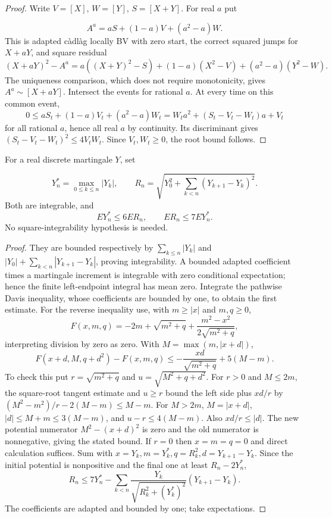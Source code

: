 \begin{proof}
Write $V=[X]$, $W=[Y]$, $S=[X+Y]$. For real $a$ put

\[
 A^a=aS+(1-a)V+(a^2-a)W.
\] This is adapted c\`adl\`ag locally BV with zero
start, the correct squared jumps for $X+aY$, and square residual
\[
 (X+aY)^2-A^a=a((X+Y)^2-S)+(1-a)(X^2-V)+(a^2-a)(Y^2-W).
\]
The uniqueness comparison, which does not require monotonicity, gives
$A^a\sim[X+aY]$. Intersect the events for rational $a$.
At every time on this common event,
\[
 0\leq aS_t+(1-a)V_t+(a^2-a)W_t
 =W_ta^2+(S_t-V_t-W_t)a+V_t
\]
for all rational $a$, hence all real $a$ by continuity. Its discriminant gives
$(S_t-V_t-W_t)^2\leq4V_tW_t$. Since $V_t,W_t\geq0$, the root bound follows.
\end{proof}

\begin{lemma}
For a real discrete martingale $Y$, set

\[
 Y_n^*=\max_{0\leq k\leq n}|Y_k|,\qquad
 R_n=\sqrt{Y_0^2+\sum_{k<n}(Y_{k+1}-Y_k)^2}.
\]
Both are integrable, and
\[
 E Y_n^*\leq6E R_n,\qquad E R_n\leq7E Y_n^*.
\]
No square-integrability hypothesis is needed.
\end{lemma}
\begin{proof}
They are bounded respectively by $\sum_{k\leq n}|Y_k|$ and
$|Y_0|+\sum_{k<n}|Y_{k+1}-Y_k|$, proving integrability.
A bounded adapted coefficient times a martingale increment is integrable
with zero conditional expectation; hence the finite left-endpoint integral
has mean zero. Integrate the pathwise Davis inequality, whose coefficients
are bounded by one, to obtain the first estimate.
For the reverse inequality use, with $m\geq|x|$ and $m,q\geq0$,
\[
 F(x,m,q)=-2m+\sqrt{m^2+q}+\frac{m^2-x^2}{2\sqrt{m^2+q}},
\]
interpreting division by zero as zero. With $M=\max(m,|x+d|)$,
\[
 F(x+d,M,q+d^2)-F(x,m,q)
 \leq-\frac{xd}{\sqrt{m^2+q}}+5(M-m).
\]
To check this put $r=\sqrt{m^2+q}$ and $u=\sqrt{M^2+q+d^2}$.
For $r>0$ and $M\leq2m$, the square-root tangent estimate and $u\geq r$
bound the left side plus $xd/r$ by
$(M^2-m^2)/r-2(M-m)\leq M-m$.
For $M>2m$, $M=|x+d|$, $|d|\leq M+m\leq3(M-m)$, and $u-r\leq4(M-m)$.
Also $xd/r\leq|d|$. The new potential numerator $M^2-(x+d)^2$
is zero and the old numerator is nonnegative, giving the stated bound. If $r=0$ then $x=m=q=0$ and direct calculation suffices.
Sum with $x=Y_k,m=Y_k^*,q=R_k^2,d=Y_{k+1}-Y_k$.
Since the initial potential is nonpositive and the final one at least
$R_n-2Y_n^*$,
\[
 R_n\leq7Y_n^*-\sum_{k<n}
 \frac{Y_k}{\sqrt{R_k^2+(Y_k^*)^2}}(Y_{k+1}-Y_k).
\]
The coefficients are adapted and bounded by one; take expectations.
\end{proof}
